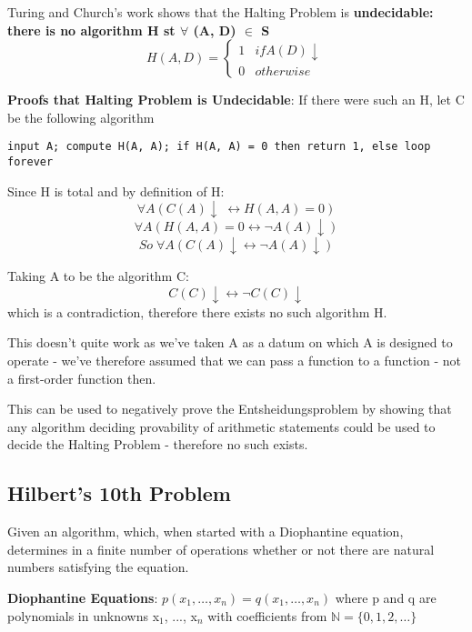 \documentclass{article}
\newenvironment{definition}{\par\color{blue}}{\par}
\begin{document}
Turing and Church's work shows that the Halting Problem is \textbf{undecidable: there is no algorithm H st $\forall$ (A, D) $\in$ S}
\begin{equation}
H(A, D)=\left\{\begin{array}{ll}{1} & {if A(D) \downarrow} \\ {0} & {otherwise }\end{array}\right.
\end{equation}

\noindent
\textbf{Proofs that Halting Problem is Undecidable}: If there were such an H, let C be the following algorithm
\begin{lstlisting}
input A; compute H(A, A); if H(A, A) = 0 then return 1, else loop forever
\end{lstlisting}

Since H is total and by definition of H:
\begin{equation}
\forall A(C(A) \downarrow \; \leftrightarrow H(A, A)=0)
\end{equation}
\begin{equation}
\forall A(H(A, A)=0 \leftrightarrow \neg A(A) \downarrow)
\end{equation}
\begin{equation}
So \; \forall A(C(A) \downarrow \leftrightarrow \neg A(A) \downarrow)
\end{equation}

Taking A to be the algorithm C:
\begin{equation}
C(C) \downarrow \leftrightarrow \neg C(C) \downarrow
\end{equation}
which is a contradiction, therefore there exists no such algorithm H.

\bigskip
This doesn't quite work as we've taken A as a datum on which A is designed to operate - we've therefore assumed that we can pass a function to a function - not a first-order function then.

This can be used to negatively prove the Entsheidungsproblem by showing that any algorithm deciding provability of arithmetic statements could be used to decide the Halting Problem - therefore no such exists.

\subsection{Hilbert's 10th Problem}
\begin{definition}
    Given an algorithm, which, when started with a Diophantine equation, determines in a finite number of operations whether or not there are natural numbers satisfying the equation.
    
    \bigskip
    \noindent
    \textbf{Diophantine Equations}: $
p\left(x_{1}, \ldots, x_{n}\right)=q\left(x_{1}, \ldots, x_{n}\right)
$ where p and q are polynomials in unknowns x$_{1}$, ..., x$_{n}$ with coefficients from $
\mathbb{N}=\{0,1,2, \ldots\}
$
\end{definition}
\end{document}
